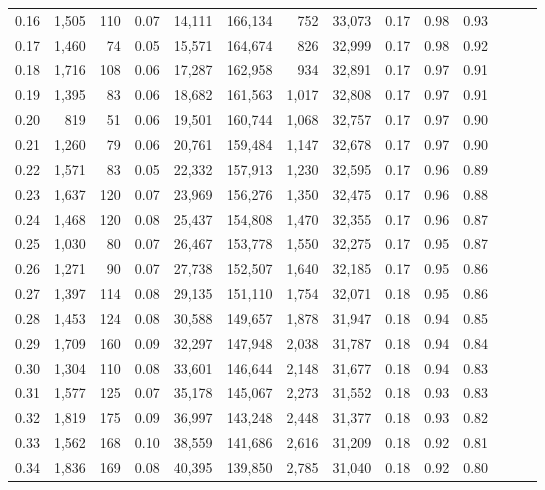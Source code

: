 \begin{tabular}{rrrrrrrrrrrrrr}
0.16 &  1,505 &  110 &  0.07 &   14,111 &  166,134 &     752 &  33,073 &  0.17 &  0.98 &      0.93 \\
0.17 &  1,460 &   74 &  0.05 &   15,571 &  164,674 &     826 &  32,999 &  0.17 &  0.98 &      0.92 \\
0.18 &  1,716 &  108 &  0.06 &   17,287 &  162,958 &     934 &  32,891 &  0.17 &  0.97 &      0.91 \\
0.19 &  1,395 &   83 &  0.06 &   18,682 &  161,563 &   1,017 &  32,808 &  0.17 &  0.97 &      0.91 \\
0.20 &    819 &   51 &  0.06 &   19,501 &  160,744 &   1,068 &  32,757 &  0.17 &  0.97 &      0.90 \\
0.21 &  1,260 &   79 &  0.06 &   20,761 &  159,484 &   1,147 &  32,678 &  0.17 &  0.97 &      0.90 \\
0.22 &  1,571 &   83 &  0.05 &   22,332 &  157,913 &   1,230 &  32,595 &  0.17 &  0.96 &      0.89 \\
0.23 &  1,637 &  120 &  0.07 &   23,969 &  156,276 &   1,350 &  32,475 &  0.17 &  0.96 &      0.88 \\
0.24 &  1,468 &  120 &  0.08 &   25,437 &  154,808 &   1,470 &  32,355 &  0.17 &  0.96 &      0.87 \\
0.25 &  1,030 &   80 &  0.07 &   26,467 &  153,778 &   1,550 &  32,275 &  0.17 &  0.95 &      0.87 \\
0.26 &  1,271 &   90 &  0.07 &   27,738 &  152,507 &   1,640 &  32,185 &  0.17 &  0.95 &      0.86 \\
0.27 &  1,397 &  114 &  0.08 &   29,135 &  151,110 &   1,754 &  32,071 &  0.18 &  0.95 &      0.86 \\
0.28 &  1,453 &  124 &  0.08 &   30,588 &  149,657 &   1,878 &  31,947 &  0.18 &  0.94 &      0.85 \\
0.29 &  1,709 &  160 &  0.09 &   32,297 &  147,948 &   2,038 &  31,787 &  0.18 &  0.94 &      0.84 \\
0.30 &  1,304 &  110 &  0.08 &   33,601 &  146,644 &   2,148 &  31,677 &  0.18 &  0.94 &      0.83 \\
0.31 &  1,577 &  125 &  0.07 &   35,178 &  145,067 &   2,273 &  31,552 &  0.18 &  0.93 &      0.83 \\
0.32 &  1,819 &  175 &  0.09 &   36,997 &  143,248 &   2,448 &  31,377 &  0.18 &  0.93 &      0.82 \\
0.33 &  1,562 &  168 &  0.10 &   38,559 &  141,686 &   2,616 &  31,209 &  0.18 &  0.92 &      0.81 \\
0.34 &  1,836 &  169 &  0.08 &   40,395 &  139,850 &   2,785 &  31,040 &  0.18 &  0.92 &      0.80 \\

\end{tabular}
